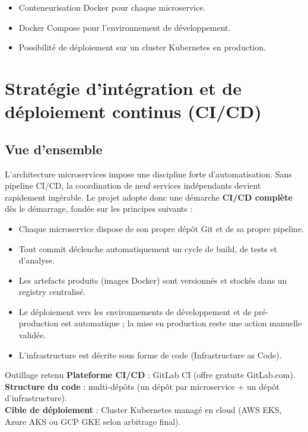 \documentclass[12pt,a4paper]{article}
\newcommand{\highlight}[1]{\textbf{\color{primary}#1}}
\begin{document}
\begin{itemize}[leftmargin=*,itemsep=4pt]
    \item Conteneurisation Docker pour chaque microservice.
    \item Docker Compose pour l'environnement de développement.
    \item Possibilité de déploiement sur un cluster Kubernetes en production.
\end{itemize}

\newpage

\section{Stratégie d'intégration et de déploiement continus (CI/CD)}

\subsection{Vue d'ensemble}

L'architecture microservices impose une discipline forte d'automatisation. Sans pipeline CI/CD, la coordination de neuf services indépendants devient rapidement ingérable. Le projet adopte donc une démarche \highlight{CI/CD complète} dès le démarrage, fondée sur les principes suivants :

\begin{itemize}[leftmargin=*,itemsep=4pt]
    \item Chaque microservice dispose de son propre dépôt Git et de sa propre pipeline.
    \item Tout commit déclenche automatiquement un cycle de build, de tests et d'analyse.
    \item Les artefacts produits (images Docker) sont versionnés et stockés dans un registry centralisé.
    \item Le déploiement vers les environnements de développement et de pré-production est automatique ; la mise en production reste une action manuelle validée.
    \item L'infrastructure est décrite sous forme de code (Infrastructure as Code).
\end{itemize}

\begin{infobox}{Outillage retenu}
\textbf{Plateforme CI/CD} : GitLab CI (offre gratuite GitLab.com). \\
\textbf{Structure du code} : multi-dépôts (un dépôt par microservice + un dépôt d'infrastructure). \\
\textbf{Cible de déploiement} : Cluster Kubernetes managé en cloud (AWS EKS, Azure AKS ou GCP GKE selon arbitrage final).
\end{infobox}
\end{document}
